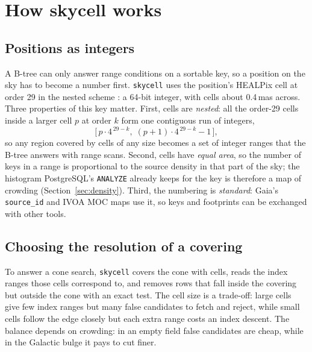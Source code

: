 \documentclass[final,5p,times,twocolumn,authoryear]{elsarticle}
\newcommand{\Sect}{Section}
\begin{document}
\section{How skycell works}
\label{sec:method}

\subsection{Positions as integers}
\label{sec:key}

A B-tree can only answer range conditions on a sortable key, so a position on the sky
has to become a number first. \texttt{skycell} uses the position's HEALPix cell at order
29 in the nested scheme \citep{healpix}: a 64-bit integer, with cells about 0.4\,mas
across. Three properties of this key matter. First, cells are \emph{nested}: all the
order-29 cells inside a larger cell $p$ at order $k$ form one contiguous run of
integers,
\begin{equation}
  \bigl[\, p\cdot 4^{\,29-k},\; (p+1)\cdot 4^{\,29-k} - 1 \,\bigr],
  \label{eq:interval}
\end{equation}
so any region covered by cells of any size becomes a set of integer ranges that the
B-tree answers with range scans. Second, cells have \emph{equal area}, so the number of
keys in a range is proportional to the source density in that part of the sky; the
histogram PostgreSQL's \texttt{ANALYZE} already keeps for the key is therefore a map of
crowding (\Sect~\ref{sec:density}). Third, the numbering is \emph{standard}: Gaia's
\texttt{source\_id} \citep{gaia} and IVOA MOC maps \citep{moc} use it, so keys and
footprints can be exchanged with other tools.

\subsection{Choosing the resolution of a covering}
\label{sec:cost}

To answer a cone search, \texttt{skycell} covers the cone with cells, reads the index
ranges those cells correspond to, and removes rows that fall inside the covering but
outside the cone with an exact test. The cell size is a trade-off: large cells give few index
ranges but many false candidates to fetch and reject, while small cells follow the edge
closely but each extra range costs an index descent. The balance depends on crowding:
in an empty field false candidates are cheap, while in the Galactic bulge it pays to cut
finer.
\end{document}
